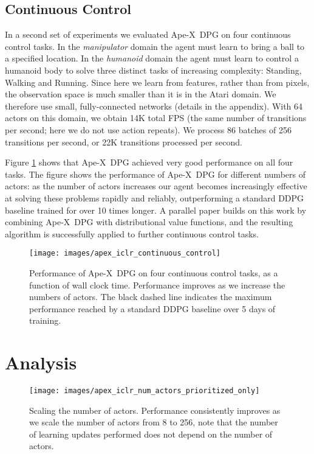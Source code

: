 \documentclass{article} \PassOptionsToPackage{usenames,dvipsnames}{xcolor}
\def\apex{Ape-X}
\def\smallcaption#1{\caption{\small #1}\vspace{-0.4cm}}
\begin{document}
\subsection{Continuous Control}

In a second set of experiments we evaluated \apex\ DPG on four continuous control tasks. In the \emph{manipulator} domain the agent must learn to bring a ball to a specified location. In the \emph{humanoid} domain the agent must learn to control a humanoid body to solve three distinct tasks of increasing complexity: Standing, Walking and Running. Since here we learn from features, rather than from pixels, the observation space is much smaller than it is in the Atari domain. We therefore use small, fully-connected networks (details in the appendix). With 64 actors on this domain, we obtain 14K total FPS (the same number of transitions per second; here we do not use action repeats). We process 86 batches of 256 transitions per second, or 22K transitions processed per second. 

Figure \ref{fig:continuous_control} shows that \apex\ DPG achieved very good performance on all four tasks. The figure shows the performance of \apex\ DPG for different numbers of actors: as the number of actors increases our agent becomes increasingly effective at solving these problems rapidly and reliably, outperforming a standard DDPG baseline trained for over 10 times longer. A parallel paper \citep{d4pg} builds on this work by combining \apex\ DPG with distributional value functions, and the resulting algorithm is successfully applied to further continuous control tasks. 

\begin{figure}[t]
    \centering
    \texttt{[image: images/apex\_iclr\_continuous\_control]}
    \smallcaption{Performance of \apex\ DPG on four continuous control tasks, as a function of wall clock time. Performance improves as we increase the numbers of actors. The black dashed line indicates the maximum performance reached by a standard DDPG baseline over 5 days of training.}
    \label{fig:continuous_control}
\end{figure}

\section{Analysis}

\begin{figure}
    \centering
    \texttt{[image: images/apex\_iclr\_num\_actors\_prioritized\_only]}
    \smallcaption{Scaling the number of actors. Performance consistently improves as we scale the number of actors from 8 to 256, note that the number of learning updates performed does not depend on the number of actors.}
    \label{fig:num_actors_prioritized_only}
\end{figure}
\end{document}
